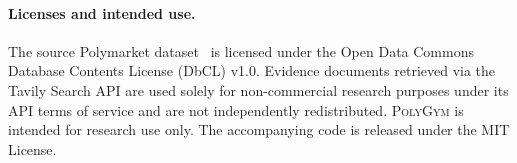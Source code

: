 \documentclass[11pt]{article}
\theoremstyle{plain}
\theoremstyle{definition}
\begin{document}
\paragraph{Licenses and intended use.}
The source Polymarket dataset~\citep{kaggle_polymarket_dataset} is licensed under 
the Open Data Commons Database Contents License (DbCL) v1.0. 
Evidence documents retrieved via the Tavily Search API are used 
solely for non-commercial research purposes under its API terms 
of service and are not independently redistributed. \textsc{PolyGym} is 
intended for research use only. The accompanying code is released 
under the MIT License.





\end{document}

